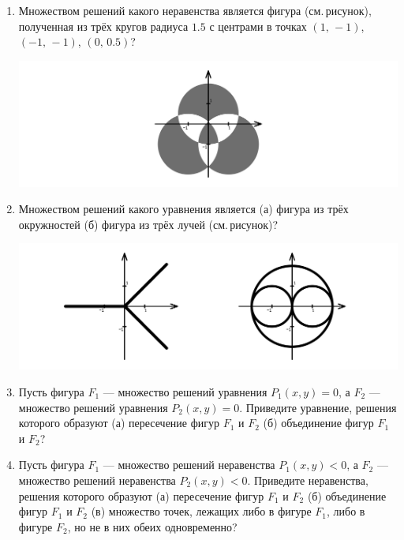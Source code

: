 \begin{enumerate}
\item Множеством решений какого неравенства является фигура (см.\,рисунок), полученная из трёх кругов радиуса $1.5$ с центрами в точках $(1,\,-1)$, $(-1,\,-1)$, $(0,\,0.5)$?

\centerline{\includegraphics[width=13.75cm]{stats/2018/graph/3}}

\item Множеством решений какого уравнения является (а) фигура из трёх окружностей (б) фигура из трёх лучей (см.\,рисунок)?

\centerline{\includegraphics[width=13.75cm]{stats/2018/graph/4}}

\item Пусть фигура $F_1$ — множество решений уравнения $P_1(x,y) = 0$, а $F_2$ — множество решений уравнения $P_2 (x,y) = 0$. Приведите уравнение, решения которого образуют (а) пересечение фигур $F_1$ и $F_2$ (б) объединение фигур $F_1$ и $F_2$?

\item Пусть фигура $F_1$ — множество решений неравенства $P_1(x,y) < 0$, а $F_2$ — множество решений неравенства $P_2 (x,y) < 0$. Приведите неравенства, решения которого образуют (а) пересечение фигур $F_1$ и $F_2$ (б) объединение фигур $F_1$ и $F_2$ (в) множество точек, лежащих либо в фигуре $F_1$, либо в фигуре $F_2$, но не в них обеих одновременно?

\end{enumerate}